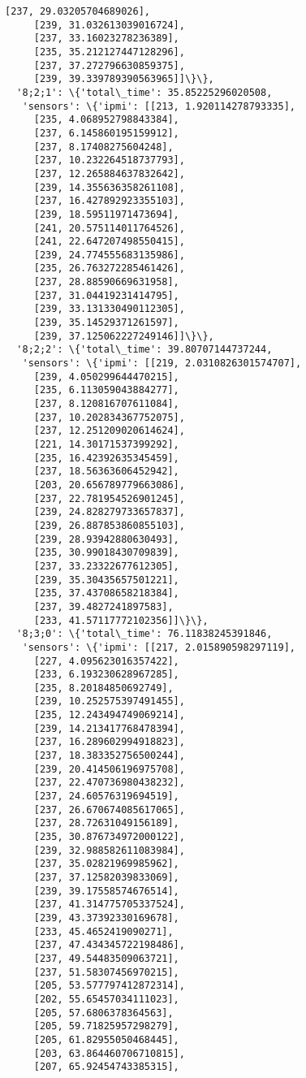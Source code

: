 \documentclass[11pt]{article}
\begin{document}
\begin{tcolorbox}[breakable, size=fbox, boxrule=.5pt, pad at break*=1mm, opacityfill=0]
\begin{Verbatim}[commandchars=\\\{\}]
     [237, 29.03205704689026],
     [239, 31.032613039016724],
     [237, 33.16023278236389],
     [235, 35.212127447128296],
     [237, 37.272796630859375],
     [239, 39.339789390563965]]\}\},
  '8;2;1': \{'total\_time': 35.85225296020508,
   'sensors': \{'ipmi': [[213, 1.920114278793335],
     [235, 4.068952798843384],
     [237, 6.145860195159912],
     [237, 8.17408275604248],
     [237, 10.232264518737793],
     [237, 12.265884637832642],
     [239, 14.355636358261108],
     [237, 16.427892923355103],
     [239, 18.59511971473694],
     [241, 20.575114011764526],
     [241, 22.647207498550415],
     [239, 24.774555683135986],
     [235, 26.763272285461426],
     [237, 28.88590669631958],
     [237, 31.04419231414795],
     [239, 33.131330490112305],
     [239, 35.14529371261597],
     [239, 37.125062227249146]]\}\},
  '8;2;2': \{'total\_time': 39.80707144737244,
   'sensors': \{'ipmi': [[219, 2.0310826301574707],
     [239, 4.050299644470215],
     [235, 6.113059043884277],
     [237, 8.120816707611084],
     [237, 10.202834367752075],
     [237, 12.251209020614624],
     [221, 14.30171537399292],
     [235, 16.42392635345459],
     [237, 18.56363606452942],
     [203, 20.656789779663086],
     [237, 22.781954526901245],
     [239, 24.828279733657837],
     [239, 26.887853860855103],
     [239, 28.93942880630493],
     [235, 30.99018430709839],
     [237, 33.23322677612305],
     [239, 35.30435657501221],
     [235, 37.43708658218384],
     [237, 39.4827241897583],
     [233, 41.57117772102356]]\}\},
  '8;3;0': \{'total\_time': 76.11838245391846,
   'sensors': \{'ipmi': [[217, 2.015890598297119],
     [227, 4.095623016357422],
     [233, 6.193230628967285],
     [235, 8.20184850692749],
     [239, 10.252575397491455],
     [235, 12.243494749069214],
     [239, 14.213417768478394],
     [237, 16.289602994918823],
     [237, 18.383352756500244],
     [239, 20.414506196975708],
     [237, 22.470736980438232],
     [237, 24.60576319694519],
     [237, 26.670674085617065],
     [237, 28.72631049156189],
     [235, 30.876734972000122],
     [239, 32.988582611083984],
     [237, 35.02821969985962],
     [237, 37.12582039833069],
     [239, 39.17558574676514],
     [237, 41.314775705337524],
     [239, 43.37392330169678],
     [233, 45.4652419090271],
     [237, 47.434345722198486],
     [237, 49.54483509063721],
     [237, 51.58307456970215],
     [205, 53.577797412872314],
     [202, 55.65457034111023],
     [205, 57.6806378364563],
     [205, 59.71825957298279],
     [205, 61.82955050468445],
     [203, 63.864460706710815],
     [207, 65.92454743385315],

\end{Verbatim}
\end{tcolorbox}
\end{document}
